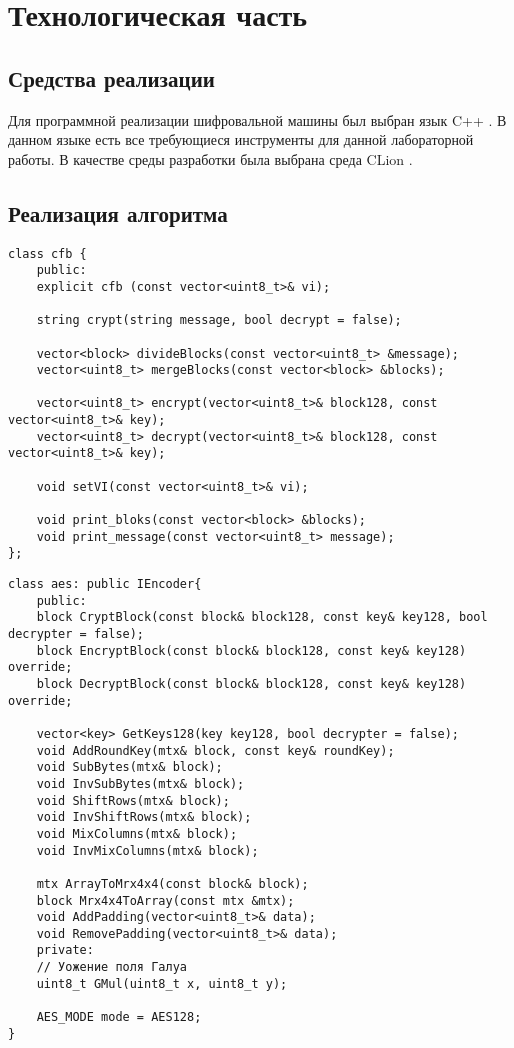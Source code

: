 \chapter{Технологическая часть}

\section{Средства реализации}

Для программной реализации шифровальной машины был выбран язык C++ \cite{cpp}.
В данном языке есть все требующиеся инструменты для данной лабораторной работы.
В качестве среды разработки была выбрана среда CLion \cite{clion}.

\section{Реализация алгоритма}

\begin{lstlisting}[label=lst:CFB,caption=Класс реализации режима CFB]
class cfb {
	public:
	explicit cfb (const vector<uint8_t>& vi);
	
	string crypt(string message, bool decrypt = false);
	
	vector<block> divideBlocks(const vector<uint8_t> &message);
	vector<uint8_t> mergeBlocks(const vector<block> &blocks);
	
	vector<uint8_t> encrypt(vector<uint8_t>& block128, const vector<uint8_t>& key);
	vector<uint8_t> decrypt(vector<uint8_t>& block128, const vector<uint8_t>& key);
	
	void setVI(const vector<uint8_t>& vi);
	
	void print_bloks(const vector<block> &blocks);
	void print_message(const vector<uint8_t> message);
};
\end{lstlisting}


\clearpage

\begin{lstlisting}[label=lst:aes,caption=Класс шифрования и дешифрования AES]
class aes: public IEncoder{
	public:
	block CryptBlock(const block& block128, const key& key128, bool decrypter = false);
	block EncryptBlock(const block& block128, const key& key128) override;
	block DecryptBlock(const block& block128, const key& key128) override;
	
	vector<key> GetKeys128(key key128, bool decrypter = false);
	void AddRoundKey(mtx& block, const key& roundKey);
	void SubBytes(mtx& block);
	void InvSubBytes(mtx& block);
	void ShiftRows(mtx& block);
	void InvShiftRows(mtx& block);
	void MixColumns(mtx& block);
	void InvMixColumns(mtx& block);
	
	mtx ArrayToMrx4x4(const block& block);
	block Mrx4x4ToArray(const mtx &mtx);
	void AddPadding(vector<uint8_t>& data);
	void RemovePadding(vector<uint8_t>& data);
	private:
	// Уожение поля Галуа
	uint8_t GMul(uint8_t x, uint8_t y);
	
	AES_MODE mode = AES128;
}
\end{lstlisting}

